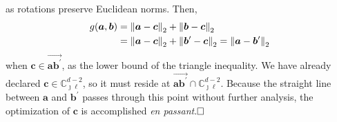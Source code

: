   as rotations preserve Euclidean norms.  Then,
  \begin{equation*}
    \begin{aligned}
    g(\bm{a}, \bm{b}) &= \pnorm{\bm{a} - \bm{c}}{2} + \pnorm{\bm{b} - \bm{c}}{2}\\
    &= \pnorm{\bm{a} - \bm{c}}{2} + \pnorm{\bm{b}^{\prime} - \bm{c}}{2} = \pnorm{\bm{a} - \bm{b}^{\prime}}{2}
    \end{aligned}
  \end{equation*}
  when $\bm{c} \in \overrightarrow{\bm{a}\bm{b}^{\prime}}$, as the lower bound of the triangle inequality.  We have already declared $\bm{c}\in{\mathbb C}_{\jmath\ell}^{d-2}$, so it must reside at $\overrightarrow{\bm{a}\bm{b}^{\prime}}\cap{\mathbb C}_{\jmath\ell}^{d-2}$.  Because the straight line between $\bm{a}$ and $\bm{b}^{\prime}$ passes through this point without further analysis, the optimization of $\bm{c}$ is accomplished \emph{en passant}.$\hfill\Box$
  


